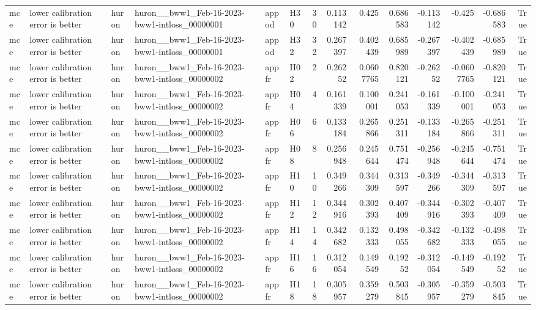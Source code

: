 \begin{longtable}{llllllrrrrrrrr}
mce & lower calibration error is better & huron & huron\_\_bww1\_Feb-16-2023-bww1-intloss\_00000001 & appod & H30 & 30 & 0.113142 & 0.425 & 0.686583 & -0.113142 & -0.425 & -0.686583 & True \\
mce & lower calibration error is better & huron & huron\_\_bww1\_Feb-16-2023-bww1-intloss\_00000001 & appod & H32 & 32 & 0.267397 & 0.402439 & 0.685989 & -0.267397 & -0.402439 & -0.685989 & True \\
mce & lower calibration error is better & huron & huron\_\_bww1\_Feb-16-2023-bww1-intloss\_00000002 & appfr & H02 & 2 & 0.26252 & 0.0607765 & 0.820121 & -0.26252 & -0.0607765 & -0.820121 & True \\
mce & lower calibration error is better & huron & huron\_\_bww1\_Feb-16-2023-bww1-intloss\_00000002 & appfr & H04 & 4 & 0.161339 & 0.100001 & 0.241053 & -0.161339 & -0.100001 & -0.241053 & True \\
mce & lower calibration error is better & huron & huron\_\_bww1\_Feb-16-2023-bww1-intloss\_00000002 & appfr & H06 & 6 & 0.133184 & 0.265866 & 0.251311 & -0.133184 & -0.265866 & -0.251311 & True \\
mce & lower calibration error is better & huron & huron\_\_bww1\_Feb-16-2023-bww1-intloss\_00000002 & appfr & H08 & 8 & 0.256948 & 0.245644 & 0.751474 & -0.256948 & -0.245644 & -0.751474 & True \\
mce & lower calibration error is better & huron & huron\_\_bww1\_Feb-16-2023-bww1-intloss\_00000002 & appfr & H10 & 10 & 0.349266 & 0.344309 & 0.313597 & -0.349266 & -0.344309 & -0.313597 & True \\
mce & lower calibration error is better & huron & huron\_\_bww1\_Feb-16-2023-bww1-intloss\_00000002 & appfr & H12 & 12 & 0.344916 & 0.302393 & 0.407409 & -0.344916 & -0.302393 & -0.407409 & True \\
mce & lower calibration error is better & huron & huron\_\_bww1\_Feb-16-2023-bww1-intloss\_00000002 & appfr & H14 & 14 & 0.342682 & 0.132333 & 0.498055 & -0.342682 & -0.132333 & -0.498055 & True \\
mce & lower calibration error is better & huron & huron\_\_bww1\_Feb-16-2023-bww1-intloss\_00000002 & appfr & H16 & 16 & 0.312054 & 0.149549 & 0.19252 & -0.312054 & -0.149549 & -0.19252 & True \\
mce & lower calibration error is better & huron & huron\_\_bww1\_Feb-16-2023-bww1-intloss\_00000002 & appfr & H18 & 18 & 0.305957 & 0.359279 & 0.503845 & -0.305957 & -0.359279 & -0.503845 & True \\

\end{longtable}
